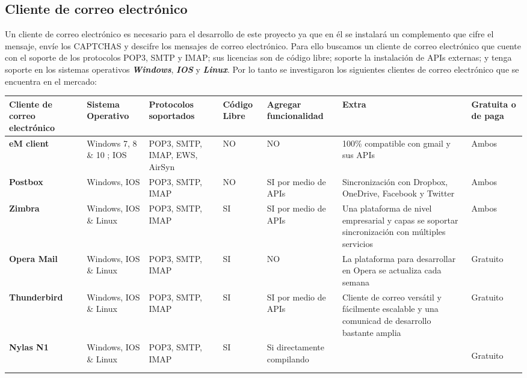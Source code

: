 \subsection{Cliente de correo electrónico}
Un cliente de correo electrónico es necesario para el desarrollo de este proyecto ya que en él se instalará un complemento que cifre el mensaje, envíe los CAPTCHAS y descifre los mensajes de correo electrónico. Para ello buscamos un cliente de correo electrónico que cuente con el soporte de los protocolos POP3, SMTP y IMAP; sus licencias son de código libre; soporte la instalación de APIs externas; y tenga soporte en los sistemas operativos \textbf{\textit{Windows}}, \textbf{\textit{IOS}} y \textbf{\textit{Linux}}. Por lo tanto se investigaron los siguientes clientes de correo electrónico que se encuentra en el mercado: \\
\begin{longtable}[H]{| p{} | p{2cm} |p{2cm}|p{}|p{2cm}|p{3cm}|p{2cm}|}%
 \hline
 \textbf{Cliente de correo electrónico}&\textbf{Sistema Operativo}&\textbf{Protocolos soportados}&\textbf{Código Libre}&\textbf{Agregar funcionalidad}&\textbf{Extra}&\textbf{Gratuita o de paga}\\
 \hline
 \textbf{eM client}&Windows 7, 8 \& 10 ; IOS&POP3, SMTP, IMAP, EWS, AirSyn&NO&NO&100\% compatible con gmail y sus APIs&Ambos\\
 \hline
 \textbf{Postbox}&Windows, IOS&POP3, SMTP, IMAP&NO&SI por medio de APIs&Sincronización con Dropbox, OneDrive, Facebook y Twitter&Ambos\\
 \hline
 \textbf{Zimbra}&Windows, IOS \& Linux&POP3, SMTP, IMAP&SI&SI por medio de APIs&Una plataforma de nivel empresarial y capas se soportar sincronización con múltiples servicios&Ambos\\
 \hline
 \textbf{Opera Mail}&Windows, IOS \& Linux&POP3, SMTP, IMAP&SI&NO&La plataforma para desarrollar en Opera se actualiza cada semana&Gratuito\\
 \hline
 \textbf{Thunderbird}&Windows, IOS \& Linux&POP3, SMTP, IMAP&SI&SI por medio de APIs&Cliente de correo versátil y fácilmente escalable y una comunicad de desarrollo bastante amplia&Gratuito\\
 \hline
 \textbf{Nylas N1}&Windows, IOS \& Linux&POP3, SMTP, IMAP&SI&Si directamente compilando& &Gratuito
 
    \label{tabla:Descripcion de clientes}

\end{longtable}

